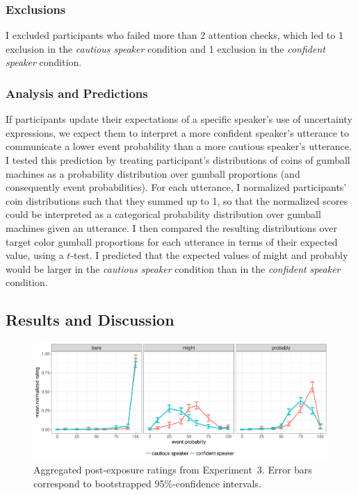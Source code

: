 \subsubsection{Exclusions}

I excluded participants who failed more than 2 attention checks, which led to 1 exclusion in the \emph{cautious speaker} condition and 1 exclusion in the \emph{confident speaker} condition.


\subsubsection{Analysis and Predictions}

If participants update their expectations of a specific speaker's use of uncertainty expressions,  we expect them to interpret a more confident speaker's utterance 
to communicate a lower event probability than a more cautious speaker's utterance. I tested this prediction by treating participant's distributions of coins 
of gumball machines as a probability distribution over gumball proportions (and consequently event probabilities).  For each utterance, I 
normalized participants' coin distributions such that they summed up to 1, so that the normalized scores could be interpreted
as a categorical probability distribution over gumball machines given an utterance. I then compared the resulting distributions
over target color gumball proportions for each utterance in terms of their expected value, using a $t$-test.
 I predicted that the expected values of 
{\sc might} and {\sc probably} would be larger in the \emph{cautious speaker} condition than in the \emph{confident speaker} condition.

\subsection{Results and Discussion}

\begin{figure}
\includegraphics[width=\textwidth]{plots/fig-14-exp-2-ratings.pdf}
\caption{Aggregated post-exposure ratings from Experiment~3. Error bars correspond to bootstrapped 95\%-confidence intervals.  \label{fig:adaptation-results-comp}}
\end{figure}

